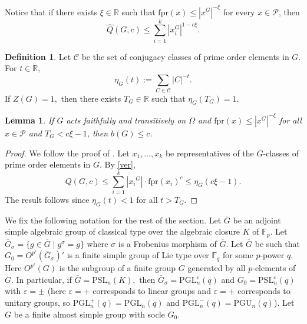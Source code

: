 \documentclass[a4paper,reqno,11pt]{amsart}
\newtheorem{Lem}[Th]{Lemma}
\theoremstyle{definition}
\newtheorem{Def}[Th]{Definition}
\theoremstyle{remark}
\numberwithin{equation}{section}
\newcommand{\fpr}{{\mathrm{fpr}}}
\newcommand{\PSL}{{\mathrm{PSL}}}
\newcommand{\PGL}{{\mathrm{PGL}}}
\newcommand{\PGU}{{\mathrm{PGU}}}
\begin{document}
Notice that if there exists $\xi \in \mathbb{R}$ such that $\fpr({x})\le |{x}^{{G}}|^{-\xi}$ for every  ${x} \in \mathscr{P}$,  then  
$$\widehat{Q}(G,c)\le \sum_{i=1}^{k}|{x}_i^{{G}}|^{1-c\xi}.$$



\begin{Def}
Let $\mathscr{C}$ be the set of conjugacy classes of prime order elements in ${G}$.
For $t \in \mathbb{R},$ 
$$\eta_G(t):= \sum_{C \in \mathscr{C}}|C|^{-t}.$$
If $Z(G)=1,$ then there exists $T_G \in \mathbb{R}$ such that $\eta_G(T_G) = 1.$
\end{Def}





\begin{Lem}\label{11}
	If $G$ acts faithfully and transitively on $\Omega$ and  $\fpr({x})\le|{x}^{{G}}|^{-\xi}$ for all  ${x} \in \mathscr{P}$ and $T_G < c\xi - 1$, then $b(G) \le c$.
\end{Lem}
\begin{proof}
We follow the proof of \cite[Proposition 2.1]{burness}. Let ${x}_1, \ldots, {x}_k$ be representatives of the ${G}$-classes
of prime order elements in ${G}$. %
By \eqref{ver}, 
$$Q(G,c) \le  \sum_{i=1}^{k}|{x_i}^{{G}}|\cdot \fpr({x}_i)^c \le \eta_G(c\xi - 1).$$
The result follows since $\eta_G(t) < 1$ for all $t>T_G.$
\end{proof}

We fix the following notation for the rest of the section. Let $\overline{G}$ be an adjoint simple algebraic group of classical type over the algebraic closure $K$ of ${\mathbb{F}_p}$. Let $\overline{G}_{\sigma}=\{g \in \overline{G} \mid g^{\sigma}=g\}$ where $\sigma$ is a Frobenius morphism of $\overline{G}.$ Let $\overline{G}$ be such that $G_0=O^{p'}(\overline{G}_{\sigma})'$ is a finite simple group of Lie type over $\mathbb{F}_q$ for some $p$-power $q$. Here  $O^{p'}(G)$ is the subgroup of a finite group $G$ generated by all $p$-elements of $G$. In particular, if $\overline{G}=\PSL_n(K),$ then $\overline{G}_{\sigma}=\PGL_n^{\varepsilon}(q)$ and $G_0=\PSL_n^{\varepsilon}(q)$ with $\varepsilon=\pm$ (here $\varepsilon =+$ corresponds to linear groups and $\varepsilon =+$ corresponds to unitary groups, so $\PGL_n^+(q)=\PGL_n(q)$ and $\PGL_n^-(q)=\PGU_n(q)$). Let  $G$ be a finite almost simple  group with  socle $G_0.$  
\end{document}

